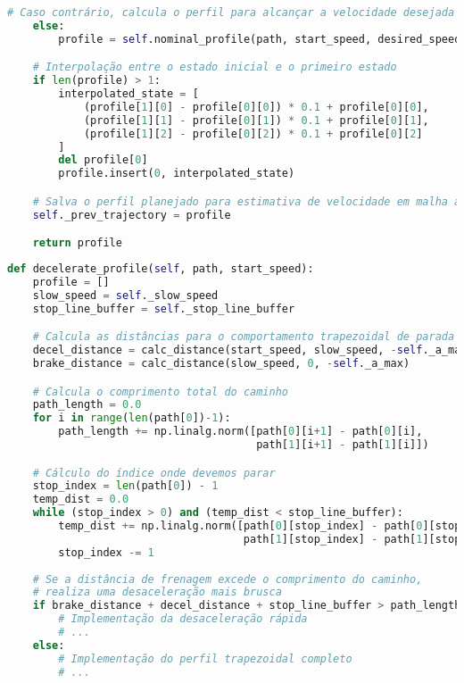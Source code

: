 \documentclass[
	12pt,				%
	oneside, %
	a4paper,			%
	english,			%
	french,				%
	spanish,			%
	brazil				%
	]{abntex2}
\begin{document}
\begin{apendicesenv}
\begin{lstlisting}[language=Python, caption=Implementação do método principal para cálculo do perfil de velocidade., label=lst:compute_velocity_profile_implementation]
    # Caso contrário, calcula o perfil para alcançar a velocidade desejada
    else:
        profile = self.nominal_profile(path, start_speed, desired_speed)

    # Interpolação entre o estado inicial e o primeiro estado
    if len(profile) > 1:
        interpolated_state = [
            (profile[1][0] - profile[0][0]) * 0.1 + profile[0][0], 
            (profile[1][1] - profile[0][1]) * 0.1 + profile[0][1], 
            (profile[1][2] - profile[0][2]) * 0.1 + profile[0][2]
        ]
        del profile[0]
        profile.insert(0, interpolated_state)

    # Salva o perfil planejado para estimativa de velocidade em malha aberta
    self._prev_trajectory = profile

    return profile
\end{lstlisting}

\begin{lstlisting}[language=Python, caption=Implementação parcial do método para geração de perfil de desaceleração., label=lst:decelerate_profile_implementation]
def decelerate_profile(self, path, start_speed): 
    profile = []
    slow_speed = self._slow_speed
    stop_line_buffer = self._stop_line_buffer

    # Calcula as distâncias para o comportamento trapezoidal de parada
    decel_distance = calc_distance(start_speed, slow_speed, -self._a_max)
    brake_distance = calc_distance(slow_speed, 0, -self._a_max)

    # Calcula o comprimento total do caminho
    path_length = 0.0
    for i in range(len(path[0])-1):
        path_length += np.linalg.norm([path[0][i+1] - path[0][i], 
                                       path[1][i+1] - path[1][i]])

    # Cálculo do índice onde devemos parar
    stop_index = len(path[0]) - 1
    temp_dist = 0.0
    while (stop_index > 0) and (temp_dist < stop_line_buffer):
        temp_dist += np.linalg.norm([path[0][stop_index] - path[0][stop_index-1], 
                                     path[1][stop_index] - path[1][stop_index-1]])
        stop_index -= 1
    
    # Se a distância de frenagem excede o comprimento do caminho,
    # realiza uma desaceleração mais brusca
    if brake_distance + decel_distance + stop_line_buffer > path_length:
        # Implementação da desaceleração rápida
        # ...
    else:
        # Implementação do perfil trapezoidal completo
        # ...
\end{lstlisting}


\end{apendicesenv}
\end{document}
